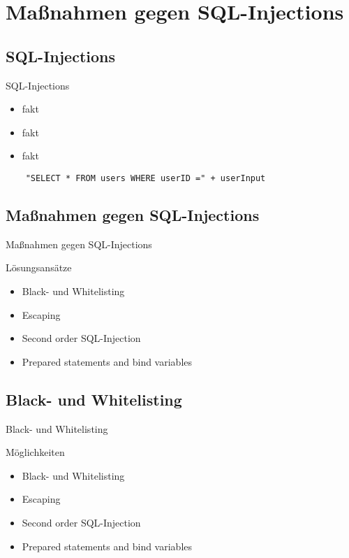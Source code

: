 \section{Maßnahmen gegen SQL-Injections}

\subsection{SQL-Injections}
\begin{frame}{SQL-Injections}
\begin{block}
\begin{itemize}
	\item fakt
	\item fakt
	\item fakt
\end{itemize}
\end{block}
\end{frame}

\begin{frame}{}
\begin{block}
\begin{lstlisting}
	"SELECT * FROM users WHERE userID =" + userInput
\end{lstlisting}}
\end{block}
\begin{lstlisting}
	"SELECT * FROM users WHERE userID =" + userInput
\end{lstlisting}
\end{frame}


\subsection{Maßnahmen gegen SQL-Injections}
\begin{frame}{Maßnahmen gegen SQL-Injections}
\begin{block}{Lösungsansätze}
\begin{itemize}
\item Black- und Whitelisting
\item Escaping
\item Second order SQL-Injection
\item Prepared statements and bind variables
\end{itemize}
\end{block}
\end{frame}

\subsection{Black- und Whitelisting}
\begin{frame}{Black- und Whitelisting}
\begin{block}{Möglichkeiten}
\begin{itemize}
\item Black- und Whitelisting
\item Escaping
\item Second order SQL-Injection
\item Prepared statements and bind variables
\end{itemize}
\end{block}
\end{frame}

